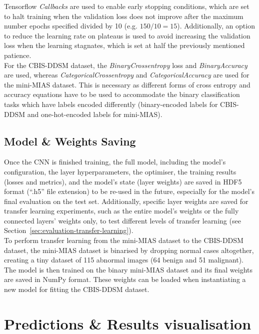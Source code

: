 Tensorflow \textit{Callbacks} are used to enable early stopping conditions, which are set to halt training when the validation loss does not improve after the maximum number epochs specified divided by 10 (e.g. $150/10=15$). Additionally, an option to reduce the learning rate on plateaus is used to avoid increasing the validation loss when the learning stagnates, which is set at half the previously mentioned patience.\\

For the CBIS-DDSM dataset, the \textit{BinaryCrossentropy} loss and \textit{BinaryAccuracy} are used, whereas \textit{CategoricalCrossentropy} and \textit{CategoricalAccuracy} are used for the mini-MIAS dataset. This is necessary as different forms of cross entropy and accuracy equations have to be used to accommodate the binary classification tasks which have labels encoded differently (binary-encoded labels for CBIS-DDSM and one-hot-encoded labels for mini-MIAS).

\subsection{Model \& Weights Saving}
\label{sec:implementation-model-saving-minimiasbinary}

Once the CNN is finished training, the full model, including the model's configuration, the layer hyperparameters, the optimiser, the training results (losses and metrics), and the model's state (layer weights) are saved in HDF5 format (``.h5'' file extension) to be re-used in the future, especially for the model's final evaluation on the test set. Additionally, specific layer weights are saved for transfer learning experiments, such as the entire model's weights or the fully connected layers' weights only, to test different levels of transfer learning (see Section~\ref{sec:evaluation-transfer-learning}).\\

To perform transfer learning from the mini-MIAS dataset to the CBIS-DDSM dataset, the mini-MIAS dataset is binarised by dropping normal cases altogether, creating a tiny dataset of 115 abnormal images (64 benign and 51 malignant). The model is then trained on the binary mini-MIAS dataset and its final weights are saved in NumPy format. These weights can be loaded when instantiating a new model for fitting the CBIS-DDSM dataset.


\section{Predictions \& Results visualisation}

